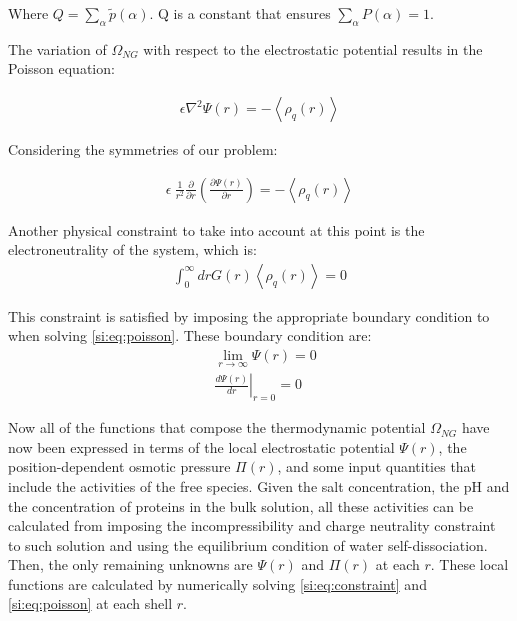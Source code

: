 \documentclass[journal=jacsat,manuscript=suppinfo]{achemso}
\begin{document}
	\noindent Where $Q = \sum_\alpha {\tilde{p}(\alpha)}$. Q is a constant that ensures $\sum_\alpha P(\alpha) = 1$.
	
	The variation of $\Omega_{NG}$ with respect to the electrostatic potential results in the Poisson equation:
	
	\begin{align}
		\epsilon\nabla^2\Psi(r) = -\left<\rho_q(r)\right>
	\end{align}
	
	Considering the symmetries of our problem:
	
	\begin{align}
		\epsilon ~ \frac{1}{r^2} \frac{\partial}{\partial r}\left(\frac{\partial \Psi(r)}{\partial r}\right) = -\left<\rho_q(r)\right>
		\label{si:eq:poisson}
	\end{align}
	
	Another physical constraint to take into account at this point is the electroneutrality of the system, which is:
	\begin{align}
		\int_0^\infty{drG(r) \left<\rho_q(r)\right>} = 0
	\end{align}
	
	This constraint is satisfied by imposing  the appropriate boundary condition to when solving \cref{si:eq:poisson}. 
	These boundary condition are:
	\begin{align}
		&  \lim_{r\to\infty}\Psi(r) = 0 \\
		&  \left.\frac{d\Psi(r)}{dr}\right|_{r=0} = 0
		\label{eq:si:contorno}
\end{align}


Now all of the functions that compose the thermodynamic potential $\Omega_{NG}$ have now been expressed in terms of the local electrostatic potential $\Psi(r)$, the position-dependent osmotic pressure $\Pi(r)$, and some input quantities that include the activities of the free species.
Given the salt concentration, the pH and the concentration of proteins in the bulk solution, all these activities can be calculated from imposing the incompressibility and charge neutrality constraint to such solution and using the equilibrium condition of water self-dissociation. 
Then, the only remaining unknowns are  $\Psi(r)$  and  $\Pi(r)$ at each $r$.
These local functions are calculated by numerically solving \cref{si:eq:constraint} and \cref{si:eq:poisson}  at each shell $r$.
\end{document}

